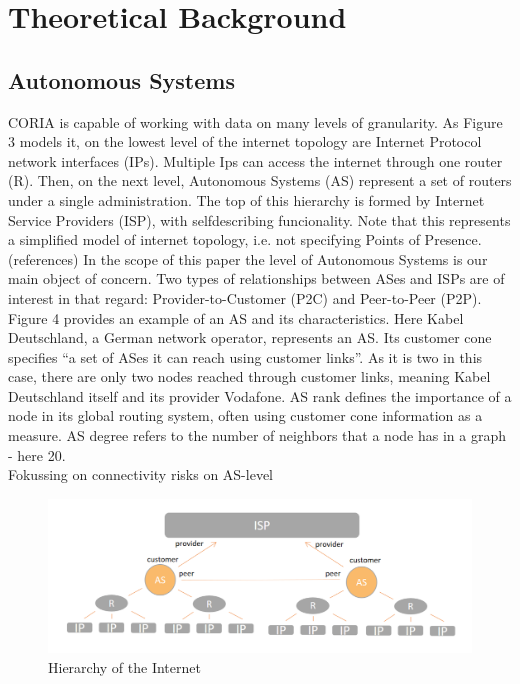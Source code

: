 \documentclass[conference]{IEEEtran}
\begin{document}
\section{Theoretical Background}
\subsection{Autonomous Systems}

CORIA is capable of working with data on many levels of granularity. As Figure 3 models it, on the lowest level of the internet topology are Internet Protocol network interfaces (IPs). Multiple Ips can access the internet through one router (R). Then, on the next level, Autonomous Systems (AS) represent a set of routers under a single administration. The top of this hierarchy is formed by Internet Service Providers (ISP), with selfdescribing funcionality. Note that this represents a simplified model of internet topology, i.e. not specifying Points of Presence. (references) In the scope of this paper the level of Autonomous Systems is our main object of concern. Two types of relationships between ASes and ISPs are of interest in that regard: Provider-to-Customer (P2C) and Peer-to-Peer (P2P). Figure 4 provides an example of an AS and its characteristics. Here Kabel Deutschland, a German network operator, represents an AS. Its customer cone specifies  ``a set of ASes it can reach using customer links''. As it is two in this case, there are only two nodes reached through customer links, meaning Kabel Deutschland itself and its provider Vodafone.  
AS rank defines the importance of a node in its global routing system, often using customer cone information as a measure. 
AS degree refers to the number of neighbors that a node has in a graph - here 20.  \\


Fokussing on connectivity risks on AS-level \\






\begin{figure}[htbp]
\centerline{\includegraphics[scale=0.23]{Graphics/hierarchy.PNG}}
\caption{Hierarchy of the Internet}
\label{fig}
\end{figure}
\end{document}
